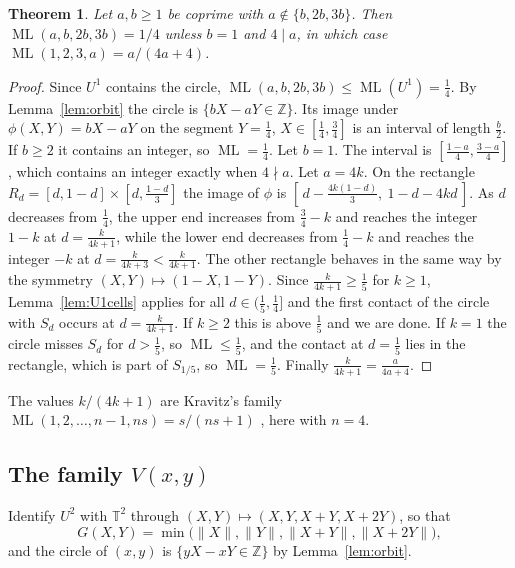 \documentclass[12pt]{amsart}
\newtheorem{theorem}{Theorem}[section]
\theoremstyle{definition}\newtheorem{definition}[theorem]{Definition}
\theoremstyle{remark}\newtheorem{remark}[theorem]{Remark}
\newcommand{\Z}{\mathbb Z}\newcommand{\R}{\mathbb R}\newcommand{\T}{\mathbb T}
\newcommand{\norm}[1]{\lVert #1\rVert}
\newcommand{\ML}{\operatorname{ML}}
\newcommand{\Uone}{U^{1}}\newcommand{\Utwo}{U^{2}}
\begin{document}
\begin{theorem}\label{thm:U1}
Let $a,b\ge1$ be coprime with $a\notin\{b,2b,3b\}$. Then $\ML(a,b,2b,3b)=1/4$ unless $b=1$ and $4\mid a$, in which case $\ML(1,2,3,a)=a/(4a+4)$.
\end{theorem}
\begin{proof}
Since $\Uone$ contains the circle, $\ML(a,b,2b,3b)\le\ML(\Uone)=\frac14$. By Lemma~\ref{lem:orbit} the circle is $\{bX-aY\in\Z\}$. Its image under $\phi(X,Y)=bX-aY$ on the segment $Y=\frac14$, $X\in[\frac14,\frac34]$ is an interval of length $\frac b2$. If $b\ge2$ it contains an integer, so $\ML=\frac14$. Let $b=1$. The interval is $[\frac{1-a}4,\frac{3-a}4]$, which contains an integer exactly when $4\nmid a$. Let $a=4k$. On the rectangle $R_d=[d,1-d]\times[d,\frac{1-d}3]$ the image of $\phi$ is $[\,d-\frac{4k(1-d)}3,\ 1-d-4kd\,]$. As $d$ decreases from $\frac14$, the upper end increases from $\frac34-k$ and reaches the integer $1-k$ at $d=\frac{k}{4k+1}$, while the lower end decreases from $\frac14-k$ and reaches the integer $-k$ at $d=\frac{k}{4k+3}<\frac k{4k+1}$. The other rectangle behaves in the same way by the symmetry $(X,Y)\mapsto(1-X,1-Y)$. Since $\frac k{4k+1}\ge\frac15$ for $k\ge1$, Lemma~\ref{lem:U1cells} applies for all $d\in(\frac15,\frac14]$ and the first contact of the circle with $S_d$ occurs at $d=\frac k{4k+1}$. If $k\ge2$ this is above $\frac15$ and we are done. If $k=1$ the circle misses $S_d$ for $d>\frac15$, so $\ML\le\frac15$, and the contact at $d=\frac15$ lies in the rectangle, which is part of $S_{1/5}$, so $\ML=\frac15$. Finally $\frac k{4k+1}=\frac a{4a+4}$.
\end{proof}
The values $k/(4k+1)$ are Kravitz's family $\ML(1,2,\dots,n-1,ns)=s/(ns+1)$ \cite[Theorem~5.1]{Kravitz}, here with $n=4$.

\subsection{The family $V(x,y)$}
Identify $\Utwo$ with $\T^2$ through $(X,Y)\mapsto(X,Y,X+Y,X+2Y)$, so that
\[
 G(X,Y)=\min\bigl(\norm X,\norm Y,\norm{X+Y},\norm{X+2Y}\bigr),
\]
and the circle of $(x,y)$ is $\{yX-xY\in\Z\}$ by Lemma~\ref{lem:orbit}.
\end{document}
